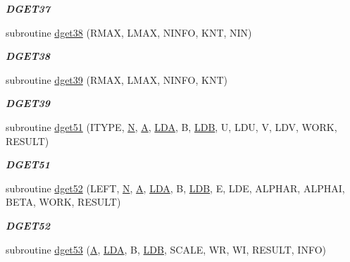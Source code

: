 \begin{DoxyCompactItemize}
\begin{DoxyCompactList}\small\item\em {\bfseries D\+G\+E\+T37} \end{DoxyCompactList}\item 
subroutine \hyperlink{group__double__eig_gae6037bff69c348a29907e03c047b4ed8}{dget38} (R\+M\+A\+X, L\+M\+A\+X, N\+I\+N\+F\+O, K\+N\+T, N\+I\+N)
\begin{DoxyCompactList}\small\item\em {\bfseries D\+G\+E\+T38} \end{DoxyCompactList}\item 
subroutine \hyperlink{group__double__eig_gaa546404302fddb3545bcd1ca639b2dd8}{dget39} (R\+M\+A\+X, L\+M\+A\+X, N\+I\+N\+F\+O, K\+N\+T)
\begin{DoxyCompactList}\small\item\em {\bfseries D\+G\+E\+T39} \end{DoxyCompactList}\item 
subroutine \hyperlink{group__double__eig_gaf6f9376de56715d7548005efd8e71a65}{dget51} (I\+T\+Y\+P\+E, \hyperlink{polmisc_8c_a0240ac851181b84ac374872dc5434ee4}{N}, \hyperlink{classA}{A}, \hyperlink{example__user_8c_ae946da542ce0db94dced19b2ecefd1aa}{L\+D\+A}, B, \hyperlink{example__user_8c_a50e90a7104df172b5a89a06c47fcca04}{L\+D\+B}, U, L\+D\+U, V, L\+D\+V, W\+O\+R\+K, R\+E\+S\+U\+L\+T)
\begin{DoxyCompactList}\small\item\em {\bfseries D\+G\+E\+T51} \end{DoxyCompactList}\item 
subroutine \hyperlink{group__double__eig_ga8af5c9297a5d6bc3f84223b499442944}{dget52} (L\+E\+F\+T, \hyperlink{polmisc_8c_a0240ac851181b84ac374872dc5434ee4}{N}, \hyperlink{classA}{A}, \hyperlink{example__user_8c_ae946da542ce0db94dced19b2ecefd1aa}{L\+D\+A}, B, \hyperlink{example__user_8c_a50e90a7104df172b5a89a06c47fcca04}{L\+D\+B}, E, L\+D\+E, A\+L\+P\+H\+A\+R, A\+L\+P\+H\+A\+I, B\+E\+T\+A, W\+O\+R\+K, R\+E\+S\+U\+L\+T)
\begin{DoxyCompactList}\small\item\em {\bfseries D\+G\+E\+T52} \end{DoxyCompactList}\item 
subroutine \hyperlink{group__double__eig_ga50f4c00fce1f7d59566e68da4fecbf29}{dget53} (\hyperlink{classA}{A}, \hyperlink{example__user_8c_ae946da542ce0db94dced19b2ecefd1aa}{L\+D\+A}, B, \hyperlink{example__user_8c_a50e90a7104df172b5a89a06c47fcca04}{L\+D\+B}, S\+C\+A\+L\+E, W\+R, W\+I, R\+E\+S\+U\+L\+T, I\+N\+F\+O)

\end{DoxyCompactItemize}
